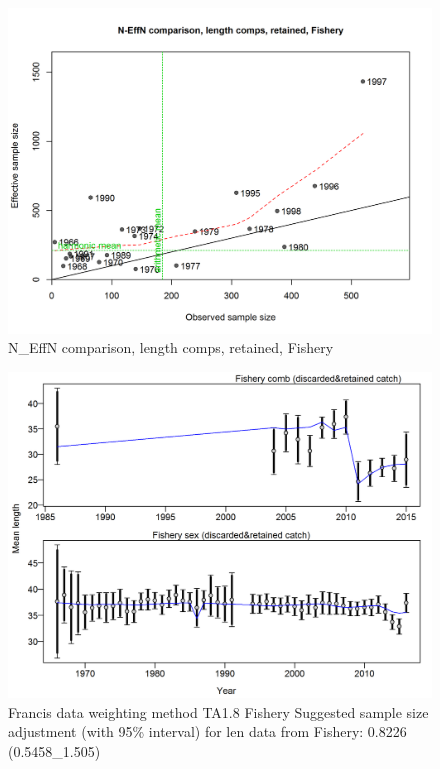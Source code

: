 \documentclass[12pt,]{article}
\begin{document}
\begin{figure}
\centering
\includegraphics{./r4ss/plots_mod1/comp_lenfit_sampsize_flt1mkt2.png}
\caption{N\_EffN comparison, length comps, retained, Fishery
\label{fig:mod1_8_comp_lenfit_sampsize_flt1mkt2}}
\end{figure}

\begin{figure}
\centering
\includegraphics{./r4ss/plots_mod1/comp_lenfit_data_weighting_TA1.8_Fishery.png}
\caption{Francis data weighting method TA1.8 Fishery Suggested sample
size adjustment (with 95\% interval) for len data from Fishery: 0.8226
(0.5458\_1.505)
\label{fig:mod1_9_comp_lenfit_data_weighting_TA1.8_Fishery}}
\end{figure}
\end{document}
